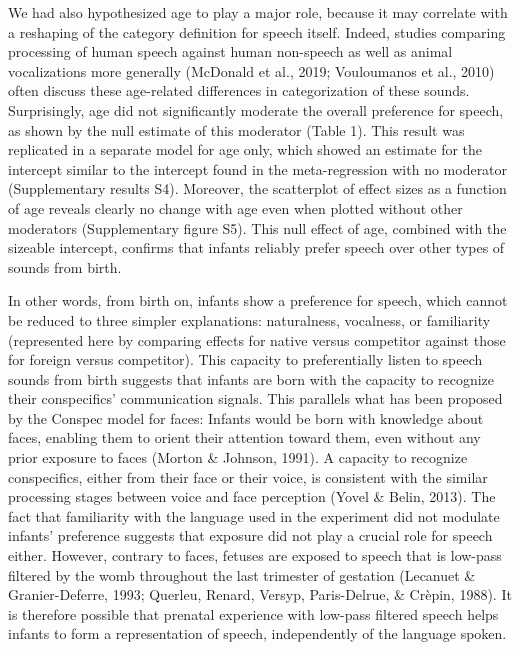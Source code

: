 \documentclass[man]{apa6}
\begin{document}
We had also hypothesized age to play a major role, because it may
correlate with a reshaping of the category definition for speech itself.
Indeed, studies comparing processing of human speech against human
non-speech as well as animal vocalizations more generally (McDonald et
al., 2019; Vouloumanos et al., 2010) often discuss these age-related
differences in categorization of these sounds. Surprisingly, age did not
significantly moderate the overall preference for speech, as shown by
the null estimate of this moderator (Table 1). This result was
replicated in a separate model for age only, which showed an estimate
for the intercept similar to the intercept found in the meta-regression
with no moderator (Supplementary results S4). Moreover, the scatterplot
of effect sizes as a function of age reveals clearly no change with age
even when plotted without other moderators (Supplementary figure S5).
This null effect of age, combined with the sizeable intercept, confirms
that infants reliably prefer speech over other types of sounds from
birth.

In other words, from birth on, infants show a preference for speech,
which cannot be reduced to three simpler explanations: naturalness,
vocalness, or familiarity (represented here by comparing effects for
native versus competitor against those for foreign versus competitor).
This capacity to preferentially listen to speech sounds from birth
suggests that infants are born with the capacity to recognize their
conspecifics' communication signals. This parallels what has been
proposed by the Conspec model for faces: Infants would be born with
knowledge about faces, enabling them to orient their attention toward
them, even without any prior exposure to faces (Morton \& Johnson,
1991). A capacity to recognize conspecifics, either from their face or
their voice, is consistent with the similar processing stages between
voice and face perception (Yovel \& Belin, 2013). The fact that
familiarity with the language used in the experiment did not modulate
infants' preference suggests that exposure did not play a crucial role
for speech either. However, contrary to faces, fetuses are exposed to
speech that is low-pass filtered by the womb throughout the last
trimester of gestation (Lecanuet \& Granier-Deferre, 1993; Querleu,
Renard, Versyp, Paris-Delrue, \& Crèpin, 1988). It is therefore possible
that prenatal experience with low-pass filtered speech helps infants to
form a representation of speech, independently of the language spoken.
\end{document}
